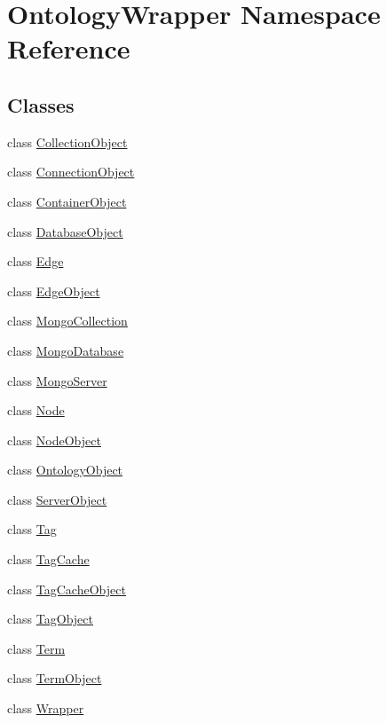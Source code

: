 \hypertarget{namespace_ontology_wrapper}{\section{Ontology\-Wrapper Namespace Reference}
\label{namespace_ontology_wrapper}
}
\subsection*{Classes}
\begin{DoxyCompactItemize}
\item 
class \hyperlink{class_ontology_wrapper_1_1_collection_object}{Collection\-Object}
\item 
class \hyperlink{class_ontology_wrapper_1_1_connection_object}{Connection\-Object}
\item 
class \hyperlink{class_ontology_wrapper_1_1_container_object}{Container\-Object}
\item 
class \hyperlink{class_ontology_wrapper_1_1_database_object}{Database\-Object}
\item 
class \hyperlink{class_ontology_wrapper_1_1_edge}{Edge}
\item 
class \hyperlink{class_ontology_wrapper_1_1_edge_object}{Edge\-Object}
\item 
class \hyperlink{class_ontology_wrapper_1_1_mongo_collection}{Mongo\-Collection}
\item 
class \hyperlink{class_ontology_wrapper_1_1_mongo_database}{Mongo\-Database}
\item 
class \hyperlink{class_ontology_wrapper_1_1_mongo_server}{Mongo\-Server}
\item 
class \hyperlink{class_ontology_wrapper_1_1_node}{Node}
\item 
class \hyperlink{class_ontology_wrapper_1_1_node_object}{Node\-Object}
\item 
class \hyperlink{class_ontology_wrapper_1_1_ontology_object}{Ontology\-Object}
\item 
class \hyperlink{class_ontology_wrapper_1_1_server_object}{Server\-Object}
\item 
class \hyperlink{class_ontology_wrapper_1_1_tag}{Tag}
\item 
class \hyperlink{class_ontology_wrapper_1_1_tag_cache}{Tag\-Cache}
\item 
class \hyperlink{class_ontology_wrapper_1_1_tag_cache_object}{Tag\-Cache\-Object}
\item 
class \hyperlink{class_ontology_wrapper_1_1_tag_object}{Tag\-Object}
\item 
class \hyperlink{class_ontology_wrapper_1_1_term}{Term}
\item 
class \hyperlink{class_ontology_wrapper_1_1_term_object}{Term\-Object}
\item 
class \hyperlink{class_ontology_wrapper_1_1_wrapper}{Wrapper}
\end{DoxyCompactItemize}
